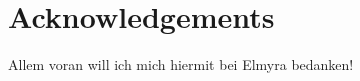 
\section*{Acknowledgements}

    \label{chap:acknowledgements}

    \thispagestyle{empty}

    

    Allem voran will ich mich hiermit bei Elmyra bedanken!

